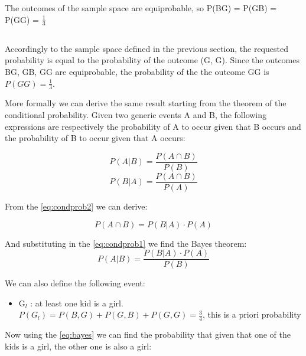 \documentclass{article}
\begin{document}
The outcomes of the sample space are equiprobable, so P(BG) = P(GB) = P(GG) = $\frac {1}{3}$


\subsection{}
Accordingly to the sample space defined in the previous section, the requested probability is equal to the probability of the outcome (G, G). Since the outcomes 
BG, GB, GG are equiprobable, the probability of the the outcome GG is $P(GG) = \frac{1}{3}$.

More formally we can derive the same result starting from the theorem of the conditional probability. Given two generic events A and B, the following expressions are respectively the probability of A to occur given that B occurs and the probability of B to occur given that A occurs:

\begin{equation} \label{eq:condprob1}
P(A | B) = \frac {P(A \cap B)} {P(B)}
\end{equation}
\begin{equation} \label{eq:condprob2}
P(B | A) = \frac {P(A \cap B)} {P(A)}
\end{equation}

From the \eqref{eq:condprob2} we can derive:

\begin{equation} \label{eq:condProb3}
P(A \cap B) = P(B | A) \cdot P(A)
\end{equation}

And substituting in the \eqref{eq:condprob1} we find the Bayes theorem:
\begin{equation} \label{eq:bayes}
P(A | B) = \frac {P(B | A) \cdot P(A)} {P(B)}
\end{equation}


We can also define the following event: 
\begin{itemize}
	\item G$_{l}$ : at least one kid is a girl. $P(G_{l}) = P(B, G) + P(G, B) + P(G, G) = \frac {3} {4}$, this is a priori probability
\end{itemize}

Now using the \eqref{eq:bayes} we can find the probability that given that one of the kids is a girl, the other one is also a girl:
\end{document}
